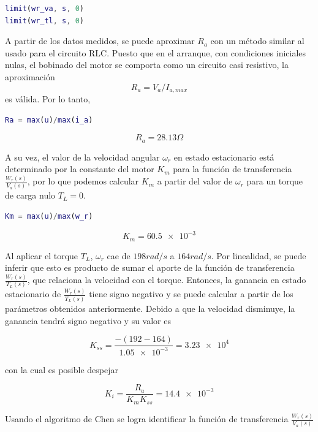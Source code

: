 \documentclass{article}
\begin{document}
\begin{lstlisting}[language=matlab]
% Segun TVF tenemos
limit(wr_va, s, 0)
limit(wr_tl, s, 0)  
\end{lstlisting}

A partir de los datos medidos, se puede aproximar $R_a$ con un método similar al usado para el circuito RLC.
Puesto que en el arranque, con condiciones iniciales nulas, el bobinado del motor se comporta como un circuito casi resistivo, la aproximación
$$R_a = V_a/I_{a,max}$$
es válida. Por lo tanto, 

\begin{lstlisting}[language=matlab]
Ra = max(u)/max(i_a)  
\end{lstlisting}

$$R_a = 28.13\Omega$$

A su vez, el valor de la velocidad angular $\omega_r$ en estado estacionario está determinado
por la constante del motor $K_m$ para la función de transferencia $\frac{W_r(s)}{V_a(s)}$, por
lo que podemos calcular $K_m$ a partir del valor de $\omega_r$ para un torque de carga nulo $T_L = 0$.

\begin{lstlisting}[language=matlab]
Km = max(u)/max(w_r)
\end{lstlisting}

$$K_m = \num{60.5e-3}$$

Al aplicar el torque $T_L$, $\omega_r$ cae de $198rad/s$ a $164rad/s$. Por linealidad, se puede inferir que esto es producto
de sumar el aporte de la función de transferencia $\frac{W_r(s)}{T_L(s)}$, que relaciona la velocidad con el torque. Entonces, la ganancia
en estado estacionario de $\frac{W_r(s)}{T_L(s)}$ tiene signo negativo y se puede calcular a partir de los 
parámetros obtenidos anteriormente. Debido a que la velocidad disminuye, la ganancia tendrá signo negativo y su valor es

$$K_{ss} = \frac{-(192-164)}{\num{1.05e-3}} = \num{3.23e4}$$

con la cual es posible despejar

$$K_i = \frac{R_a}{K_mK_{ss}} =\num{14.4e-3}$$

Usando el algoritmo de Chen se logra identificar la función de transferencia $\frac{W_r(s)}{V_a(s)}$
\end{document}
